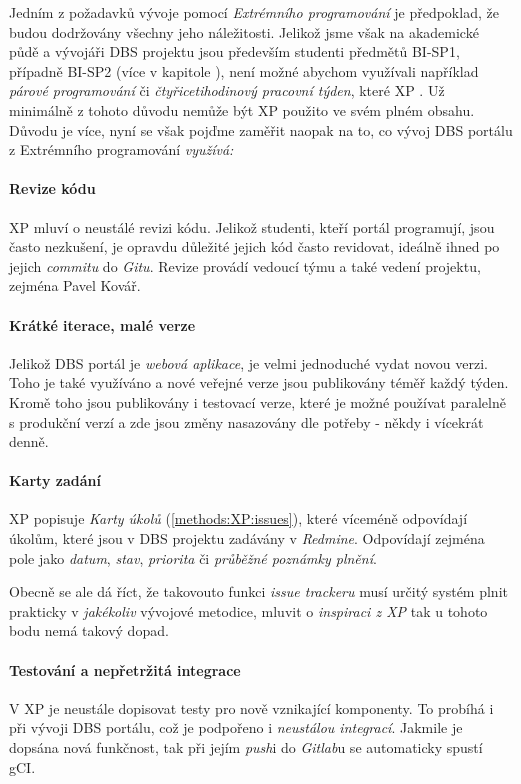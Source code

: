 Jedním z požadavků vývoje pomocí \emph{Extrémního programování} je předpoklad, že budou dodržovány všechny jeho náležitosti. Jelikož jsme však na akademické půdě a vývojáři DBS projektu jsou především studenti předmětů BI-SP1, případně BI-SP2 (více v kapitole ), není možné abychom využívali například \emph{párové programování} či \emph{čtyřicetihodinový pracovní týden}, které XP .
Už minimálně z tohoto důvodu nemůže být XP použito ve svém plném obsahu. Důvodu je více, nyní se však pojďme zaměřit naopak na to, co vývoj DBS portálu z Extrémního programování \emph{využívá:}

\paragraph{Revize kódu}
XP mluví o neustálé revizi kódu. Jelikož studenti, kteří portál programují, jsou často nezkušení, je opravdu důležité jejich kód často revidovat, ideálně ihned po jejich \emph{commitu} do \emph{Gitu}. Revize provádí vedoucí týmu a také vedení projektu, zejména Pavel Kovář.

\paragraph{Krátké iterace, malé verze}
Jelikož DBS portál je \emph{webová aplikace}, je velmi jednoduché vydat novou verzi. Toho je také využíváno a nové veřejné verze jsou publikovány téměř každý týden. Kromě toho jsou publikovány i testovací verze, které je možné používat paralelně s produkční verzí a zde jsou změny nasazovány dle potřeby - někdy i vícekrát denně.

\paragraph{Karty zadání}
XP popisuje \emph{Karty úkolů} (\ref{methods:XP:issues}), které víceméně odpovídají úkolům, které jsou v DBS projektu zadávány v \emph{Redmine}. Odpovídají zejména pole jako \emph{datum}, \emph{stav}, \emph{priorita} či \emph{průběžné poznámky plnění}.

Obecně se ale dá říct, že takovouto funkci \emph{issue trackeru} musí určitý systém plnit prakticky v \emph{jakékoliv} vývojové metodice, mluvit o \emph{inspiraci z XP} tak u tohoto bodu nemá takový dopad.

\paragraph{Testování a nepřetržitá integrace}
V XP je  neustále dopisovat testy pro nově vznikající komponenty. To probíhá i při vývoji DBS portálu, což je podpořeno i \emph{neustálou integrací}. Jakmile je dopsána nová funkčnost, tak při jejím \emph{push}i do \emph{Gitlab}u se automaticky spustí \gls{gCI}.

